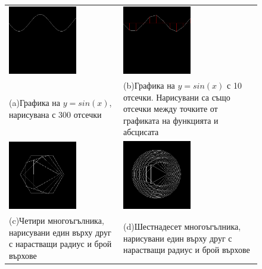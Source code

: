 {\begin{figure}
  \begin{center}
  \begin{tabular}{|p{5.2cm}p{5.2cm}|}
   \hline
   \vspace{10pt}
   \includegraphics[width=3cm]{images/graph_sine} &
   \vspace{10pt}
   \includegraphics[width=3cm]{images/graph_sine_coarse}\\
   (a)Графика на $y=sin(x)$, нарисувана с 300 отсечки&
   (b)Графика на $y=sin(x)$ с 10 отсечки. Нарисувани са също отсечки между точките от графиката на функцията и абсцисата\\%
   \vspace{10pt}
   \includegraphics[width=3cm]{images/graph_4_polygons}  &
   \vspace{10pt}
   \includegraphics[width=3cm]{images/graph_16_polygons}  \\
   (c)Четири многоъгълника, нарисувани един върху друг с нарастващи радиус и брой върхове
   \vspace{10pt}&
   (d)Шестнадесет многоъгълника, нарисувани един върху друг с нарастващи радиус и брой върхове
   \vspace{10pt}  \\%

\end{tabular}
\end{center}
\end{figure}}
